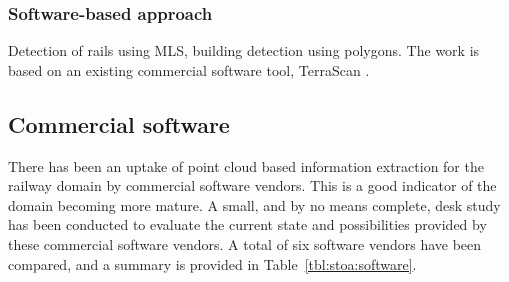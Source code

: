 \subsubsection{Software-based approach}
Detection of rails using MLS, building detection using polygons. The work is based on an existing commercial software tool, TerraScan \cite{kwoczynska2016elaboration}.

\subsection{Commercial software}\label{subsec:stoa:commsoft}
There has been an uptake of point cloud based information extraction for the railway domain by commercial software vendors. This is a good indicator of the domain becoming more mature. A small, and by no means complete, desk study has been conducted to evaluate the current state and possibilities provided by these commercial software vendors. A total of six software vendors have been compared, and a summary is provided in Table~\ref{tbl:stoa:software}. 

